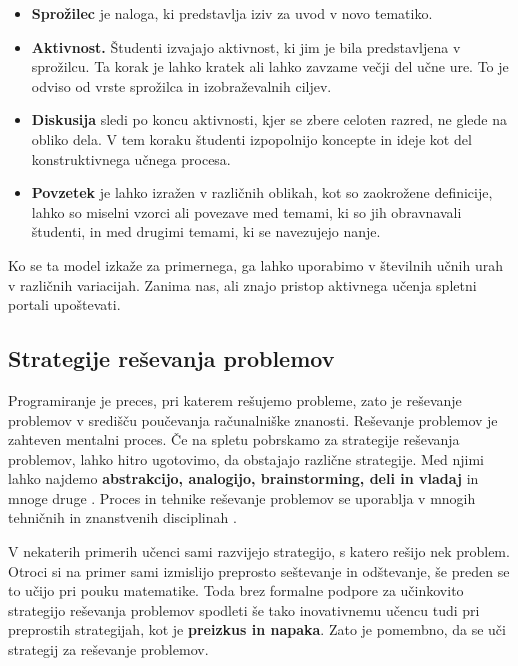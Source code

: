 \begin{itemize}
\tightlist
\item \textbf{Sprožilec} je naloga, ki predstavlja iziv za uvod v novo
tematiko.
\item \textbf{Aktivnost.} Študenti izvajajo aktivnost, ki jim je bila
predstavljena v sprožilcu. Ta korak je lahko kratek ali lahko
zavzame večji del učne ure. To je odviso od vrste sprožilca in
izobraževalnih ciljev.
\item \textbf{Diskusija} sledi po koncu aktivnosti, kjer se zbere celoten
razred, ne glede na obliko dela. V tem koraku študenti izpopolnijo
koncepte in ideje kot del konstruktivnega učnega procesa.
\item \textbf{Povzetek} je lahko izražen v različnih oblikah, kot so
zaokrožene definicije, lahko so miselni vzorci ali povezave med
temami, ki so jih obravnavali študenti, in med drugimi temami, ki se
navezujejo nanje.
\end{itemize}

Ko se ta model izkaže za primernega, ga lahko uporabimo v številnih
učnih urah v različnih variacijah. Zanima nas, ali znajo pristop
aktivnega učenja spletni portali upoštevati.

\subsection{Strategije reševanja problemov}
\label{sec:strategije_reševanja_problemov}
Programiranje je preces, pri katerem rešujemo probleme, zato je
reševanje problemov v središču poučevanja računalniške
znanosti. Reševanje problemov je zahteven mentalni proces. Če na
spletu pobrskamo za strategije reševanja problemov, lahko hitro
ugotovimo, da obstajajo različne strategije. Med njimi lahko najdemo
 \textbf{abstrakcijo, analogijo, brainstorming, deli in
  vladaj} in mnoge druge \cite{book:jausovec}. Proces in tehnike
reševanje problemov se uporablja v mnogih tehničnih in znanstvenih
disciplinah \cite{guideTCS}.

V nekaterih primerih učenci sami razvijejo strategijo, s katero rešijo
nek problem. Otroci si na primer sami izmislijo preprosto seštevanje in
odštevanje, še preden se to učijo pri pouku
matematike. Toda brez formalne podpore za učinkovito strategijo
reševanja problemov spodleti še tako inovativnemu učencu tudi pri
preprostih strategijah, kot je \textbf{preizkus in napaka}. Zato je
pomembno, da se uči strategij za reševanje problemov.


